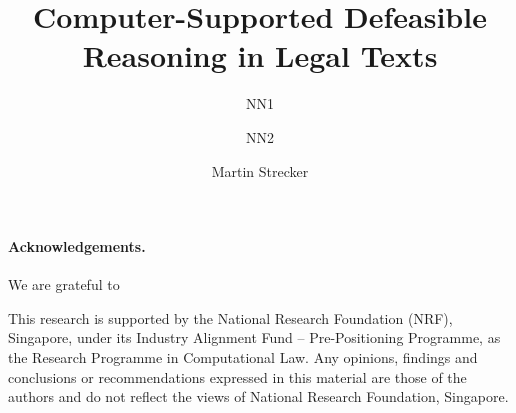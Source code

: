 \documentclass[runningheads]{llncs}
\begin{document}
\title{Computer-Supported Defeasible Reasoning in Legal Texts}

\author{NN1 \and
NN2 \and
Martin Strecker}
\maketitle

\begin{abstract}

\end{abstract}













\paragraph{Acknowledgements.}
We are grateful to  

This research is supported by the National Research Foundation (NRF),
Singapore, under its Industry Alignment Fund – Pre-Positioning Programme, as
the Research Programme in Computational Law. Any opinions, findings and
conclusions or recommendations expressed in this material are those of the
authors and do not reflect the views of National Research Foundation,
Singapore.







% 
\end{document}
